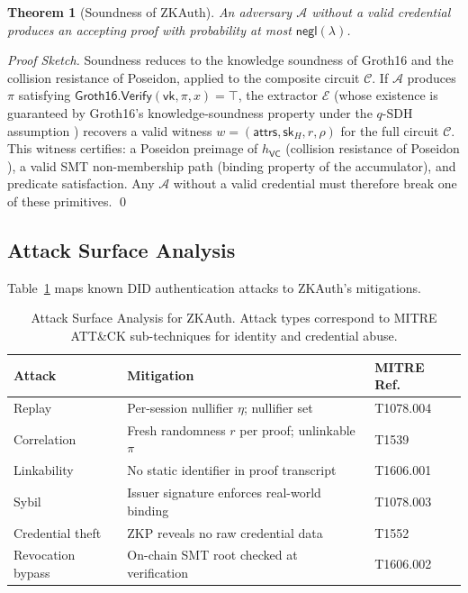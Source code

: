 \documentclass[journal,12pt,onecolumn]{IEEEtran}
\newtheorem{theorem}{Theorem}
\begin{document}
\begin{theorem}[Soundness of ZKAuth]
\label{thm:soundness}
An adversary $\mathcal{A}$ without a valid credential produces an
accepting proof with probability at most $\mathsf{negl}(\lambda)$.
\end{theorem}

\begin{proof}[Proof Sketch]
Soundness reduces to the knowledge soundness of Groth16 and the
collision resistance of Poseidon, applied to the composite circuit
$\mathcal{C}$. If $\mathcal{A}$ produces $\pi$ satisfying
$\mathsf{Groth16.Verify}(\mathsf{vk}, \pi, x) = \top$, the
extractor $\mathcal{E}$ (whose existence is guaranteed by Groth16's
knowledge-soundness property under the $q$-SDH assumption
\cite{groth2016size}) recovers a valid witness $w =
(\mathsf{attrs}, \mathsf{sk}_H, r, \rho)$ for the full circuit
$\mathcal{C}$. This witness certifies: a Poseidon preimage of
$h_{\mathsf{VC}}$ (collision resistance of Poseidon
\cite{grassi2021poseidon}), a valid SMT non-membership path (binding
property of the accumulator), and predicate satisfaction. Any
$\mathcal{A}$ without a valid credential must therefore break one
of these primitives. \qed
\end{proof}

\subsection{Attack Surface Analysis}

Table~\ref{tab:attacks} maps known DID authentication attacks to ZKAuth's
mitigations.

\begin{table}[t]
\caption{Attack Surface Analysis for ZKAuth. Attack types correspond to
MITRE ATT\&CK sub-techniques for identity and credential abuse.}
\label{tab:attacks}
\begin{tabularx}{\columnwidth}{l X X}
\toprule
\textbf{Attack} & \textbf{Mitigation} & \textbf{MITRE Ref.} \\
\midrule
Replay & Per-session nullifier $\eta$; nullifier set & T1078.004 \\
Correlation & Fresh randomness $r$ per proof; unlinkable $\pi$ & T1539 \\
Linkability & No static identifier in proof transcript & T1606.001 \\
Sybil & Issuer signature enforces real-world binding & T1078.003 \\
Credential theft & ZKP reveals no raw credential data & T1552 \\
Revocation bypass & On-chain SMT root checked at verification & T1606.002 \\
\bottomrule
\end{tabularx}
\end{table}
\end{document}
